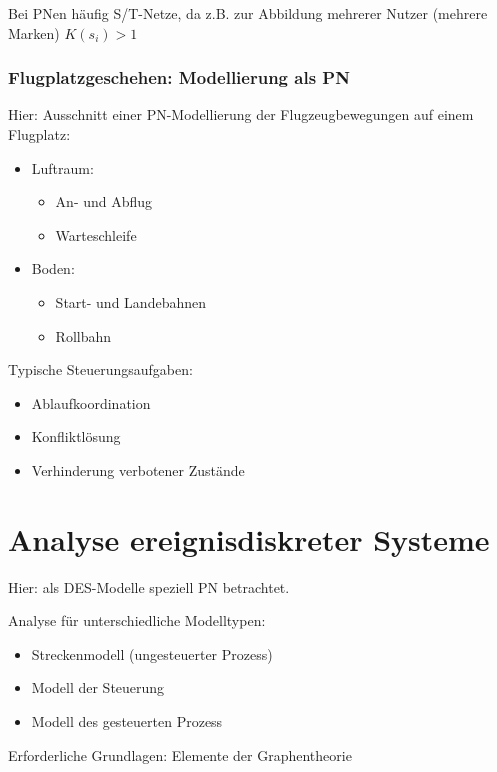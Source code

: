 Bei PNen häufig S/T-Netze, da z.B. zur Abbildung mehrerer Nutzer (mehrere Marken) $K(s_i)>1$

\subsubsection{Flugplatzgeschehen: Modellierung als PN}
Hier: Ausschnitt einer PN-Modellierung der Flugzeugbewegungen auf einem Flugplatz:

\begin{itemize}
	\item Luftraum:\\
	\begin{itemize}
		\item An- und Abflug
		\item Warteschleife
	\end{itemize}
	
	\item Boden:\\
	\begin{itemize}
		\item Start- und Landebahnen
		\item Rollbahn
	\end{itemize}
\end{itemize}


Typische Steuerungsaufgaben:
\begin{itemize}
	\item Ablaufkoordination
	\item Konfliktlösung
	\item Verhinderung verbotener Zustände
\end{itemize}

\section{Analyse ereignisdiskreter Systeme}
Hier: als DES-Modelle speziell PN betrachtet.

Analyse für unterschiedliche Modelltypen:
\begin{itemize}
	\item Streckenmodell (ungesteuerter Prozess)
	\item Modell der Steuerung
	\item Modell des gesteuerten Prozess
\end{itemize}

Erforderliche Grundlagen: Elemente der Graphentheorie 

